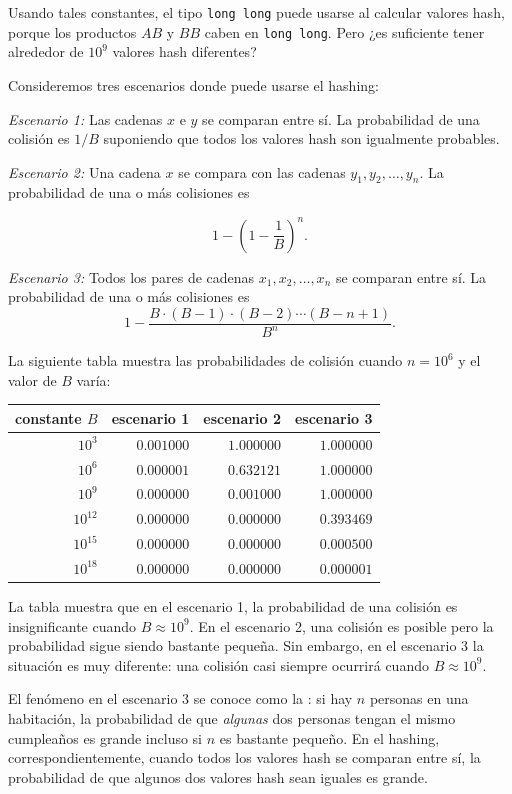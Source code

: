 Usando tales constantes,
el tipo \texttt{long long} puede usarse
al calcular valores hash,
porque los productos $AB$ y $BB$ caben en \texttt{long long}.
Pero ¿es suficiente tener alrededor de $10^9$ valores hash diferentes?

Consideremos tres escenarios donde puede usarse el hashing:

\textit{Escenario 1:} Las cadenas $x$ e $y$ se comparan entre
sí.
La probabilidad de una colisión es $1/B$ suponiendo que
todos los valores hash son igualmente probables.

\textit{Escenario 2:} Una cadena $x$ se compara con las cadenas
$y_1,y_2,\ldots,y_n$.
La probabilidad de una o más colisiones es

\[1-(1-\frac{1}{B})^n.\]

\textit{Escenario 3:} Todos los pares de cadenas $x_1,x_2,\ldots,x_n$
se comparan entre sí.
La probabilidad de una o más colisiones es
\[ 1 - \frac{B \cdot (B-1) \cdot (B-2) \cdots (B-n+1)}{B^n}.\]

La siguiente tabla muestra las probabilidades de colisión
cuando $n=10^6$ y el valor de $B$ varía:

\begin{center}
\begin{tabular}{rrrr}
constante $B$ & escenario 1 & escenario 2 & escenario 3 \\
\hline
$10^3$ & $0.001000$ & $1.000000$ & $1.000000$ \\
$10^6$ & $0.000001$ & $0.632121$ & $1.000000$ \\
$10^9$ & $0.000000$ & $0.001000$ & $1.000000$ \\
$10^{12}$ & $0.000000$ & $0.000000$ & $0.393469$ \\
$10^{15}$ & $0.000000$ & $0.000000$ & $0.000500$ \\
$10^{18}$ & $0.000000$ & $0.000000$ & $0.000001$ \\
\end{tabular}
\end{center}

La tabla muestra que en el escenario 1,
la probabilidad de una colisión es insignificante
cuando $B \approx 10^9$.
En el escenario 2, una colisión es posible pero la
probabilidad sigue siendo bastante pequeña.
Sin embargo, en el escenario 3 la situación es muy diferente:
una colisión casi siempre ocurrirá cuando
$B \approx 10^9$.


El fenómeno en el escenario 3 se conoce como la
: si hay $n$ personas
en una habitación, la probabilidad de que \emph{algunas} dos personas
tengan el mismo cumpleaños es grande incluso si $n$ es bastante pequeño.
En el hashing, correspondientemente, cuando todos los valores hash se comparan
entre sí, la probabilidad de que algunos dos
valores hash sean iguales es grande.

